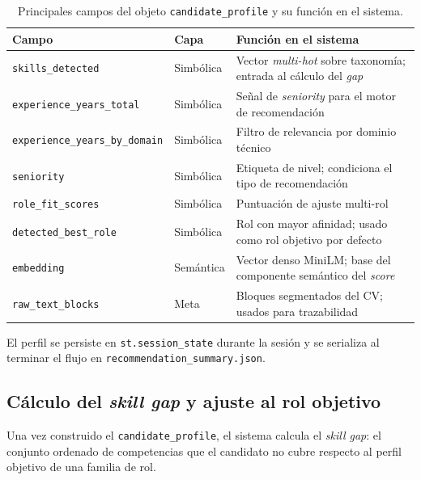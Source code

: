 \begin{table}[H]
  \caption{Principales campos del objeto \texttt{candidate\_profile} y su función en el sistema.}
  \label{tab:tabla3_5}
  \centering
  \footnotesize
  \begin{tabular}{|p{4.5cm}|p{2.0cm}|p{7.0cm}|}
    \hline
    \rowcolor{gray!15}
    \textbf{Campo} & \textbf{Capa} & \textbf{Función en el sistema} \\
    \hline
    \texttt{skills\_detected}              & Simbólica & Vector \textit{multi-hot} sobre taxonomía; entrada al cálculo del \textit{gap} \\
    \hline
    \texttt{experience\_years\_total}      & Simbólica & Señal de \textit{seniority} para el motor de recomendación \\
    \hline
    \texttt{experience\_years\_by\_domain} & Simbólica & Filtro de relevancia por dominio técnico \\
    \hline
    \texttt{seniority}                     & Simbólica & Etiqueta de nivel; condiciona el tipo de recomendación \\
    \hline
    \texttt{role\_fit\_scores}             & Simbólica & Puntuación de ajuste multi-rol \\
    \hline
    \texttt{detected\_best\_role}          & Simbólica & Rol con mayor afinidad; usado como rol objetivo por defecto \\
    \hline
    \texttt{embedding}                     & Semántica & Vector denso MiniLM; base del componente semántico del \textit{score} \\
    \hline
    \texttt{raw\_text\_blocks}             & Meta      & Bloques segmentados del CV; usados para trazabilidad \\
    \hline
  \end{tabular}
\end{table}

El perfil se persiste en \texttt{st.session\_state} durante la sesión y se serializa al terminar el flujo en \texttt{recommendation\_summary.json}.

\subsection{Cálculo del \textit{skill gap} y ajuste al rol objetivo}
\label{subsec:calculo_gap}
Una vez construido el \texttt{candidate\_profile}, el sistema calcula el \textit{skill gap}: el conjunto ordenado de competencias que el candidato no cubre respecto al perfil objetivo de una familia de rol.

